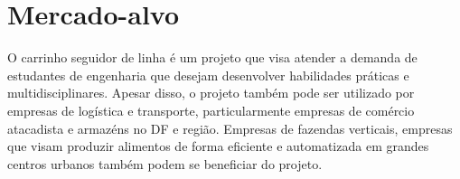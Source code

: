 \clearpage

\section{Mercado-alvo}

O carrinho seguidor de linha é um projeto que visa atender a demanda de
estudantes de engenharia que desejam desenvolver habilidades práticas e
multidisciplinares. Apesar disso, o projeto também pode ser utilizado por
empresas de logística e transporte, particularmente empresas de comércio
atacadista e armazéns no DF e região. Empresas de fazendas verticais, empresas
que visam produzir alimentos de forma eficiente e automatizada em grandes
centros urbanos também podem se beneficiar do projeto.
